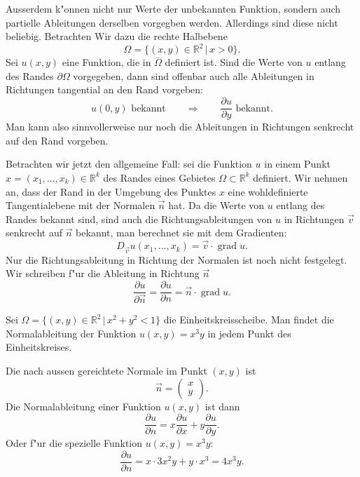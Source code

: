 Ausserdem k"onnen nicht nur Werte der unbekannten Funktion, sondern auch
partielle Ableitungen derselben vorgegben werden. Allerdings sind 
diese nicht beliebig. Betrachten Wir dazu die rechte Halbebene
\[
\Omega=\{(x,y)\in\mathbb R^2\,|\,x>0\}.
\]
Sei $u(x,y)$ eine Funktion, die in $\bar\Omega$ definiert ist.
Sind die Werte von $u$ entlang des Randes $\partial\Omega$ vorgegeben,
dann sind offenbar auch alle Ableitungen in Richtungen tangential
an den Rand vorgeben:
\[
\text{
$u(0,y)$ bekannt
}\qquad\Rightarrow\qquad
\text{$\frac{\partial u}{\partial y}$ bekannt.}
\]
Man kann also sinnvollerweise nur noch die Ableitungen
in Richtungen senkrecht auf den Rand vorgeben.

Betrachten wir jetzt den allgemeine Fall: sei die Funktion $u$
in einem Punkt $x=(x_1,\dots,x_k)\in\mathbb R^k$ des Randes
eines Gebietes $\Omega\subset\mathbb R^k$ definiert.
Wir nehmen an, dass der Rand in der Umgebung des Punktes $x$
eine wohldefinierte Tangentialebene mit der Normalen $\vec n$ hat.
Da die Werte von $u$ entlang des Randes bekannt sind, sind 
auch die Richtungsableitungen von $u$ in Richtungen $\vec v$
senkrecht auf $\vec n$ bekannt, man berechnet sie mit dem
Gradienten:
\[
D_{\vec v}u(x_1,\dots,x_k)=\vec v\cdot\operatorname{grad}u.
\]
Nur die Richtungsableitung in Richtung der Normalen 
ist noch nicht festgelegt.
Wir schreiben f"ur die Ableitung in Richtung $\vec n$
\[
\frac{\partial u}{\partial\vec n}=\frac{\partial u}{\partial n}
=\vec n\cdot\operatorname{grad}u.
\]

\begin{beispiel}
Sei $\Omega=\{(x,y)\in\mathbb R^2\,|\,x^2+y^2<1\}$ die Einheitskreisscheibe.
Man findet die Normalableitung der Funktion $u(x,y)=x^3y$ in jedem
Punkt des Einheitskreises.

Die nach aussen gereichtete Normale im Punkt $(x,y)$ ist
\[
\vec n=\begin{pmatrix}x\\y\end{pmatrix}.
\]
Die Normalableitung einer Funktion $u(x,y)$ ist dann
\[
\frac{\partial u}{\partial n}=
x\frac{\partial u}{\partial x}
+
y\frac{\partial u}{\partial y}.
\]
Oder f"ur die spezielle Funktion $u(x,y)=x^3y$:
\[
\frac{\partial u}{\partial n}
=
x\cdot 3x^2y+y\cdot x^3=
4x^3y.
\]
\end{beispiel}

